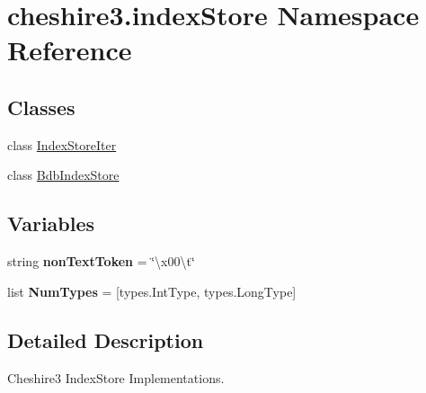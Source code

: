 \hypertarget{namespacecheshire3_1_1index_store}{\section{cheshire3.\-index\-Store Namespace Reference}
\label{namespacecheshire3_1_1index_store}
}
\subsection*{Classes}
\begin{DoxyCompactItemize}
\item 
class \hyperlink{classcheshire3_1_1index_store_1_1_index_store_iter}{Index\-Store\-Iter}
\item 
class \hyperlink{classcheshire3_1_1index_store_1_1_bdb_index_store}{Bdb\-Index\-Store}
\end{DoxyCompactItemize}
\subsection*{Variables}
\begin{DoxyCompactItemize}
\item 
\hypertarget{namespacecheshire3_1_1index_store_aeea355868eb4f7b07da1c5cd5ac2f167}{string {\bfseries non\-Text\-Token} = \char`\"{}\textbackslash{}x00\textbackslash{}t\char`\"{}}\label{namespacecheshire3_1_1index_store_aeea355868eb4f7b07da1c5cd5ac2f167}

\item 
\hypertarget{namespacecheshire3_1_1index_store_ac354d63ada412b8a862bf4d00b882b80}{list {\bfseries Num\-Types} = \mbox{[}types.\-Int\-Type, types.\-Long\-Type\mbox{]}}\label{namespacecheshire3_1_1index_store_ac354d63ada412b8a862bf4d00b882b80}

\end{DoxyCompactItemize}


\subsection{Detailed Description}
\begin{DoxyVerb}Cheshire3 IndexStore Implementations.\end{DoxyVerb}
 